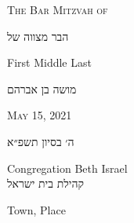 \documentclass[10pt,twoside]{article}
\begin{document}
\begin{center}
\large\textsc{The Bar Mitzvah of}\\\normalfont\large
\begin{otherlanguage}{hebrew}
הבר מצווה של
\end{otherlanguage}\normalfont
\end{center}

\vspace{0.25in}
\begin{center}
    \Huge\calligra First Middle Last\\\normalfont\huge\sffamily
\begin{otherlanguage}{hebrew}
מושה בן אברהם
\end{otherlanguage}\normalfont

    
\vspace{0.5in}
\end{center}
\vspace{0.25in}
\begin{center}
\normalfont\large\scshape May 15, 2021\\
\begin{otherlanguage}{hebrew}
ה׳ בסיון תשפ״א\\
\end{otherlanguage}
\vspace{0.25in}
Congregation Beth Israel\\
\foreignlanguage{hebrew}{קהילת בית ישראל\scshape}

Town, Place
\end{center}
\end{document}
